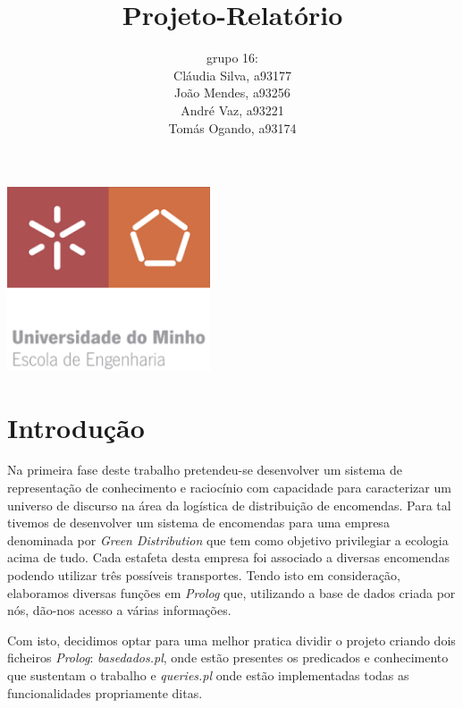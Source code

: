 \documentclass[a4paper,12pt]{article}
\title{Projeto-Relatório}
\begin{document}
\maketitle
\begin{center}
    \includegraphics[width=6cm]{imagens/uminho.png}
    \vspace*{0.5cm}
\end{center}

\begin{center}
\author{grupo 16: \\ Cláudia Silva, a93177 \\ João Mendes, a93256 \\ André Vaz, a93221 \\ Tomás Ogando, a93174}
\end{center}


\newpage

\tableofcontents

\setcounter{page}{2}


\newpage


\section{Introdução}
	Na primeira fase deste trabalho pretendeu-se desenvolver um sistema  de  representação  de  conhecimento  e raciocínio com capacidade para caracterizar um universo de discurso na área da logística de distribuição de encomendas. Para tal tivemos de desenvolver um sistema de encomendas para uma empresa denominada por \emph{Green Distribution} que tem como objetivo privilegiar a ecologia acima de tudo. Cada estafeta desta empresa foi associado a diversas encomendas podendo utilizar três possíveis transportes. Tendo isto em consideração, elaboramos diversas funções em \emph{Prolog} que, utilizando a base de dados criada por nós, dão-nos acesso a várias informações.\par
	Com isto, decidimos optar para uma melhor pratica dividir o projeto criando dois ficheiros \emph{Prolog}: \emph{basedados.pl}, onde estão presentes os predicados e conhecimento que sustentam o trabalho e \emph{queries.pl} onde estão implementadas todas as funcionalidades propriamente ditas.\par
\end{document}
